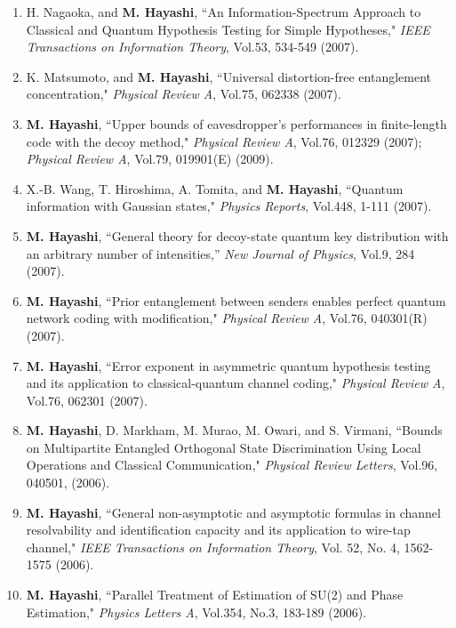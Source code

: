 \documentclass[a4paper,12pt,oneside]{article}
\begin{document}
\begin{enumerate}
\item
H. Nagaoka, and \textbf{M. Hayashi}, ``An Information-Spectrum Approach to Classical and Quantum Hypothesis Testing for Simple Hypotheses," 
{\em IEEE Transactions on Information Theory}, Vol.53, 534-549 (2007).

\item
K. Matsumoto, and \textbf{M. Hayashi}, ``Universal distortion-free entanglement concentration," 
{\em Physical Review A}, Vol.75, 062338 (2007).

\item 
\textbf{M. Hayashi}, ``Upper bounds of eavesdropper's performances in finite-length code with the decoy method," 
{\em Physical Review A}, Vol.76, 012329 (2007); 
{\em Physical Review A}, Vol.79, 019901(E) (2009).

\item
X.-B. Wang, T. Hiroshima, A. Tomita, and \textbf{M. Hayashi}, ``Quantum information with Gaussian states," 
{\em Physics Reports}, Vol.448, 1-111 (2007).

\item
\textbf{M. Hayashi}, ``General theory for decoy-state quantum key distribution with an arbitrary number of intensities,'' 
{\em New Journal of Physics}, Vol.9, 284 (2007).

\item
\textbf{M. Hayashi}, ``Prior entanglement between senders enables perfect quantum network coding with modification," 
{\em Physical Review A}, Vol.76, 040301(R) (2007).

\item
\textbf{M. Hayashi}, ``Error exponent in asymmetric quantum hypothesis testing and its application to classical-quantum channel coding,"
{\em Physical Review A}, Vol.76, 062301 (2007).

\item 
\textbf{M. Hayashi}, D. Markham, M. Murao, M. Owari, and S. Virmani, 
``Bounds on Multipartite Entangled Orthogonal State Discrimination Using Local Operations and Classical Communication," 
{\em Physical Review Letters}, Vol.96, 040501, (2006).

\item
\textbf{M. Hayashi}, ``General non-asymptotic and asymptotic formulas in channel resolvability and identification capacity and its application to wire-tap channel," 
{\em IEEE Transactions on Information Theory}, Vol. 52, No. 4, 1562-1575 (2006).

\item
\textbf{M. Hayashi}, ``Parallel Treatment of Estimation of SU(2) and Phase Estimation," 
{\em Physics Letters A}, Vol.354, No.3, 183-189 (2006).


\end{enumerate}
\end{document}

